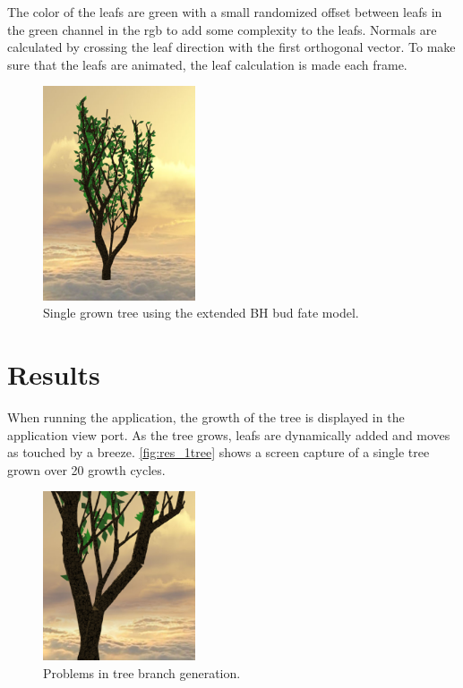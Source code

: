 \documentclass[11pt]{article} %
\begin{document}
The color of the leafs are green with a small randomized offset between leafs in the green channel in the rgb to add some complexity to the leafs.
Normals are calculated by crossing the leaf direction with the first orthogonal vector. To make sure that the leafs are animated, the leaf calculation is made each frame.

\begin{figure}[htp]
	\centering
	\includegraphics[width=0.4\textwidth]{1tree.png}
	\caption{Single grown tree using the extended BH bud fate model.}
	\label{fig:res_1tree}
\end{figure}

\section{Results}
When running the application, the growth of the tree is displayed in the application view port.
As the tree grows, leafs are dynamically added and moves as touched by a breeze.
\autoref{fig:res_1tree} shows a screen capture of a single tree grown over 20 growth cycles.
\begin{figure}[htp]
	\centering
	\includegraphics[width=0.4\textwidth]{treehole.png}
	\caption{Problems in tree branch generation.}
	\label{fig:res_treehole}
\end{figure}
\end{document}
